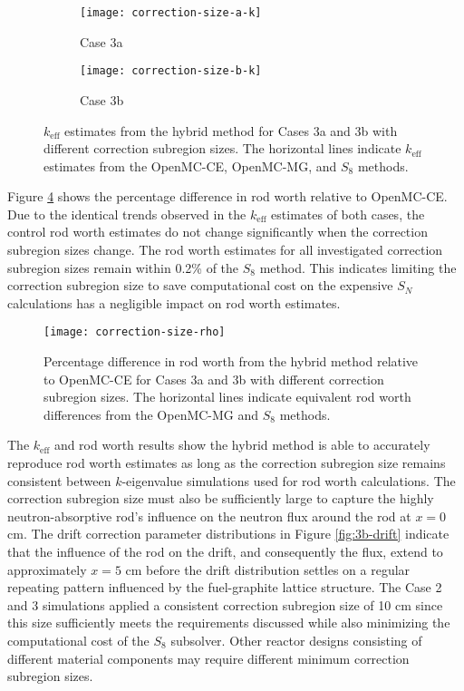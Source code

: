\begin{figure}[htb!]
  \centering
  \begin{subfigure}[b]{0.49\columnwidth}
    \centering
    \texttt{[image: correction-size-a-k]}
    \caption{Case 3a}
    \label{fig:v1-size-a-k}
  \end{subfigure}
  \hfill
  \begin{subfigure}[b]{0.49\columnwidth}
    \centering
    \texttt{[image: correction-size-b-k]}
    \caption{Case 3b}
    \label{fig:v1-size-b-k}
  \end{subfigure}
  \caption{$k_\text{eff}$ estimates from the hybrid method for Cases 3a and 3b with different
  correction subregion sizes. The horizontal lines indicate $k_\text{eff}$ estimates from the
  OpenMC-CE, OpenMC-MG, and $S_8$ methods.}
  \label{fig:v1-size-k}
\end{figure}

Figure \ref{fig:v1-size-rho} shows the percentage difference in rod worth relative to OpenMC-CE. 
Due to the identical trends observed in the $k_\text{eff}$ estimates of both cases, the control rod
worth estimates do not change significantly when the correction subregion
sizes change. The rod worth estimates for all investigated correction subregion sizes remain within
0.2\% of the $S_8$ method. This indicates limiting the correction subregion size to save
computational cost on the expensive $S_N$ calculations has a negligible impact on rod worth
estimates.

\begin{figure}[htb!]
  \centering
  \texttt{[image: correction-size-rho]}
  \caption{Percentage difference in rod worth from the hybrid method relative to OpenMC-CE for
    Cases 3a and 3b with different correction subregion sizes. The horizontal lines indicate
    equivalent rod worth differences from the OpenMC-MG and $S_8$ methods.}
  \label{fig:v1-size-rho}
\end{figure}

The $k_\text{eff}$ and rod worth results show the hybrid method is able to accurately
reproduce rod worth estimates as long as the correction subregion size remains consistent between
$k$-eigenvalue simulations used for rod worth calculations. The
correction subregion size must also be sufficiently large to capture the highly neutron-absorptive
rod's influence on the neutron flux around the rod at $x=0$ cm. The drift correction parameter
distributions in Figure \ref{fig:3b-drift} indicate that the influence of the rod on the drift, and
consequently the flux, extend to approximately $x=5$ cm before the drift distribution settles on a
regular repeating pattern influenced by the fuel-graphite lattice structure. The Case 2 and 3
simulations applied a consistent
correction subregion size of 10 cm since this size sufficiently meets the requirements
discussed while also minimizing the computational cost of the $S_8$ subsolver. Other reactor
designs consisting of different material components may require different minimum correction
subregion sizes.

